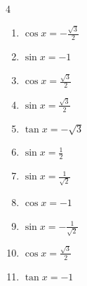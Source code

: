 \begin{multicols}{4}
\begin{enumerate}
  \item $\displaystyle \cos{x}  = -\frac{\sqrt{3}}{2}$


  \item $\displaystyle \sin{x}  = -1$


  \item $\displaystyle \cos{x}  = \frac{\sqrt{3}}{2}$


  \item $\displaystyle \sin{x}  = \frac{\sqrt{3}}{2}$


  \item $\displaystyle \tan{x}  = -\sqrt{3}$


  \item $\displaystyle \sin{x}  = \frac{1}{2}$


  \item $\displaystyle \sin{x}  = \frac{1}{\sqrt{2}}$


  \item $\displaystyle \cos{x}  = -1$


  \item $\displaystyle \sin{x}  = -\frac{1}{\sqrt{2}}$


\columnbreak %

  \item $\displaystyle \cos{x}  = \frac{\sqrt{3}}{2}$


  \item $\displaystyle \tan{x}  = -1$



\end{enumerate}
\end{multicols}
